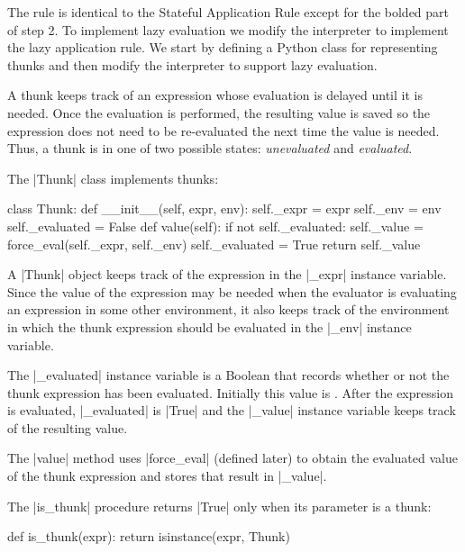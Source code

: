 \begin{schemeregion}
The rule is identical to the Stateful Application Rule except for the bolded part of step 2.  To implement lazy evaluation we modify the interpreter to implement the lazy application rule.  We start by defining a Python class for representing thunks and then modify the interpreter to support lazy evaluation.


\end{schemeregion}

\label{sec:delayingevaluation} 
A thunk keeps track of an expression whose evaluation is delayed until it is needed.  Once the evaluation is performed, the resulting value is saved so the expression does not need to be re-evaluated the next time the value is needed.  Thus, a thunk is in one of two possible states: \emph{unevaluated} and \emph{evaluated}.  

The \pycode|Thunk| class implements thunks:  
\begin{pythoncode}
class Thunk:
    def __init__(self, expr, env):
        self._expr = expr
        self._env = env
        self._evaluated = False
    def value(self):
        if not self._evaluated:
            self._value = force_eval(self._expr, self._env)
            self._evaluated = True
        return self._value
\end{pythoncode}
A \pycode|Thunk| object keeps track of the expression in the \pycode|_expr| instance variable.  Since the value of the expression may be needed when the evaluator is evaluating an expression in some other environment, it also keeps track of the environment in which the thunk expression should be evaluated in the \pycode|_env| instance variable.  

The \pycode|_evaluated| instance variable is a Boolean that records whether or not the thunk expression has been evaluated.  Initially this value is .  After the expression is evaluated, \pycode|_evaluated| is \pycode|True| and the \pycode|_value| instance variable keeps track of the resulting value.  

The \pycode|value| method uses \pycode|force_eval| (defined later) to obtain the evaluated value of the thunk expression and stores that result in \pycode|_value|.

The \pycode|is_thunk| procedure returns \pycode|True| only when its parameter is a thunk:
\begin{pythoncode}
def is_thunk(expr): return isinstance(expr, Thunk)
\end{pythoncode}

